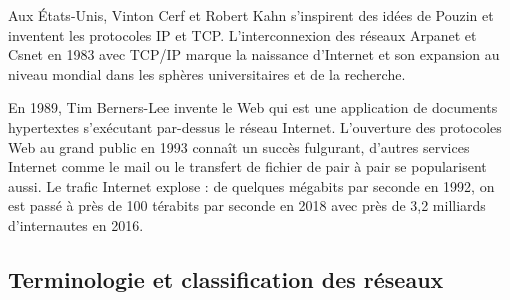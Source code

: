 \documentclass[a4paper,dvipsnames]{article}
\begin{document}
\smallskip

Aux États-Unis, Vinton Cerf et Robert Kahn s'inspirent des idées de Pouzin et inventent les protocoles {\color{red}IP} et {\color{red}TCP}. L'interconnexion des réseaux Arpanet et Csnet en 1983 avec {\color{red}TCP/IP} marque la naissance d'Internet et son expansion au niveau mondial dans les sphères universitaires et de la recherche.

\smallskip

En 1989, Tim Berners-Lee invente le {\color{red}Web} qui est une application de documents hypertextes s'exécutant par-dessus le réseau {\color{red}Internet}. L'ouverture des protocoles Web au grand public en 1993 connaît un succès fulgurant, d'autres services Internet comme le mail ou le transfert de fichier de pair à pair se popularisent aussi. Le trafic Internet explose : de quelques mégabits par seconde en 1992, on est passé à près de 100 térabits par seconde en 2018 avec près de 3,2 milliards d'internautes en 2016.

\subsection{Terminologie et classification des réseaux}
\end{document}
